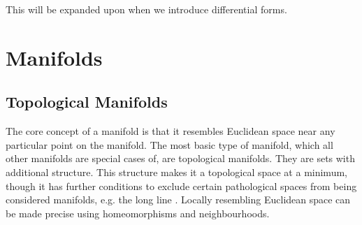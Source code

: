 \documentclass[a4paper,12pt]{article}
\begin{document}
This will be expanded upon when we introduce differential forms.

\section{Manifolds}\label{sec:manifolds}

\subsection{Topological Manifolds}\label{subsec:manifolds:topological_manifolds}

The core concept of a manifold is that it resembles Euclidean space near any particular point on the manifold.
The most basic type of manifold, which all other manifolds are special cases of, are topological manifolds.
They are sets with additional structure.
This structure makes it a topological space at a minimum, though it has further conditions to exclude certain pathological spaces from being considered manifolds, e.g. the long line \cite{nlab_long_line}.
Locally resembling Euclidean space can be made precise using homeomorphisms and neighbourhoods.
\end{document}

